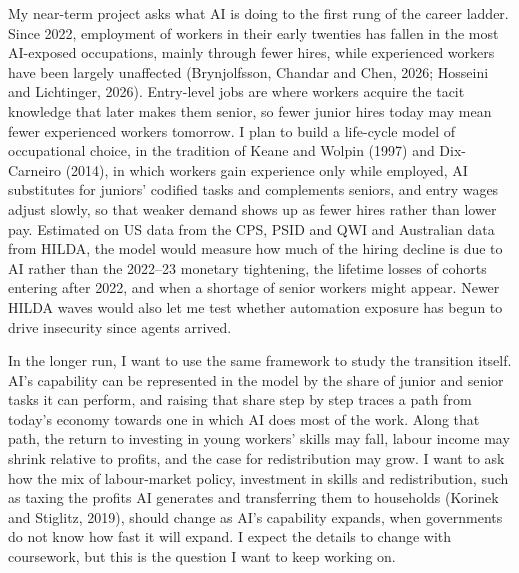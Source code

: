 \documentclass[11pt,a4paper]{article}
\newif\ifheadings
\newcommand{\heading}[1]{\ifheadings\par\medskip\textbf{#1}\par\fi}
\begin{document}
\heading{Proposed research}
My near-term project asks what AI is doing to the first rung of the career ladder. Since 2022, employment of workers in their early twenties has fallen in the most AI-exposed occupations, mainly through fewer hires, while experienced workers have been largely unaffected (Brynjolfsson, Chandar and Chen, 2026; Hosseini and Lichtinger, 2026). Entry-level jobs are where workers acquire the tacit knowledge that later makes them senior, so fewer junior hires today may mean fewer experienced workers tomorrow. I plan to build a life-cycle model of occupational choice, in the tradition of Keane and Wolpin (1997) and Dix-Carneiro (2014), in which workers gain experience only while employed, AI substitutes for juniors' codified tasks and complements seniors, and entry wages adjust slowly, so that weaker demand shows up as fewer hires rather than lower pay. Estimated on US data from the CPS, PSID and QWI and Australian data from HILDA, the model would measure how much of the hiring decline is due to AI rather than the 2022--23 monetary tightening, the lifetime losses of cohorts entering after 2022, and when a shortage of senior workers might appear. Newer HILDA waves would also let me test whether automation exposure has begun to drive insecurity since agents arrived.

In the longer run, I want to use the same framework to study the transition itself. AI's capability can be represented in the model by the share of junior and senior tasks it can perform, and raising that share step by step traces a path from today's economy towards one in which AI does most of the work. Along that path, the return to investing in young workers' skills may fall, labour income may shrink relative to profits, and the case for redistribution may grow. I want to ask how the mix of labour-market policy, investment in skills and redistribution, such as taxing the profits AI generates and transferring them to households (Korinek and Stiglitz, 2019), should change as AI's capability expands, when governments do not know how fast it will expand. I expect the details to change with coursework, but this is the question I want to keep working on.
\end{document}
